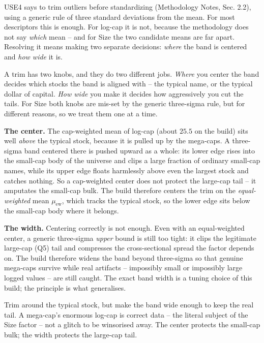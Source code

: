 \documentclass[11pt]{article}
\theoremstyle{definition}
\theoremstyle{plain}
\theoremstyle{remark}
\begin{document}
USE4 says to trim outliers before standardizing (Methodology Notes, Sec. 2.2), using a generic rule of three standard deviations from the mean. For most descriptors this is enough. For log-cap it is not, because the methodology does not say \emph{which} mean -- and for Size the two candidate means are far apart. Resolving it means making two separate decisions: \emph{where} the band is centered and \emph{how wide} it is.

\begin{intuition}
A trim has two knobs, and they do two different jobs. \emph{Where} you center the band decides which stocks the band is aligned with -- the typical name, or the typical dollar of capital. \emph{How wide} you make it decides how aggressively you cut the tails. For Size both knobs are mis-set by the generic three-sigma rule, but for different reasons, so we treat them one at a time.
\end{intuition}

\textbf{The center.} The cap-weighted mean of log-cap (about $25.5$ on the build) sits well \emph{above} the typical stock, because it is pulled up by the mega-caps. A three-sigma band centered there is pushed upward as a whole: its lower edge rises into the small-cap body of the universe and clips a large fraction of ordinary small-cap names, while its upper edge floats harmlessly above even the largest stock and catches nothing. So a cap-weighted center does not protect the large-cap tail -- it amputates the small-cap bulk. The build therefore centers the trim on the \emph{equal-weighted} mean $\mu_{\mathrm{ew}}$, which tracks the typical stock, so the lower edge sits below the small-cap body where it belongs.

\textbf{The width.} Centering correctly is not enough. Even with an equal-weighted center, a generic three-sigma \emph{upper} bound is still too tight: it clips the legitimate large-cap (Q5) tail and compresses the cross-sectional spread the factor depends on. The build therefore widens the band beyond three-sigma so that genuine mega-caps survive while real artifacts -- impossibly small or impossibly large logged values -- are still caught. The exact band width is a tuning choice of this build; the principle is what generalises.

\begin{intuition}
Trim around the typical stock, but make the band wide enough to keep the real tail. A mega-cap's enormous log-cap is correct data -- the literal subject of the Size factor -- not a glitch to be winsorised away. The center protects the small-cap bulk; the width protects the large-cap tail.
\end{intuition}
\end{document}

